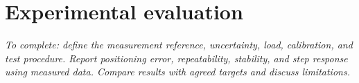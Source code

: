 \section{Experimental evaluation}
\textit{To complete: define the measurement reference, uncertainty, load, calibration, and test procedure. Report positioning error, repeatability, stability, and step response using measured data. Compare results with agreed targets and discuss limitations.}
